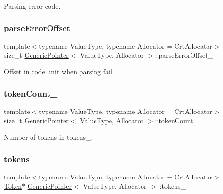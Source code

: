 Parsing error code. 

\mbox{\label{classGenericPointer_ad103ed62e206319f1f0f4aa271866e37}} 
\subsubsection{\texorpdfstring{parse\+Error\+Offset\+\_\+}{parseErrorOffset\_}}
{\footnotesize\ttfamily template$<$typename Value\+Type, typename Allocator = Crt\+Allocator$>$ \\
size\+\_\+t \hyperlink{classGenericPointer}{Generic\+Pointer}$<$ Value\+Type, Allocator $>$\+::parse\+Error\+Offset\+\_\+}



Offset in code unit when parsing fail. 

\mbox{\label{classGenericPointer_a7051cf59af6622542a050bd0ff0340f8}} 
\subsubsection{\texorpdfstring{token\+Count\+\_\+}{tokenCount\_}}
{\footnotesize\ttfamily template$<$typename Value\+Type, typename Allocator = Crt\+Allocator$>$ \\
size\+\_\+t \hyperlink{classGenericPointer}{Generic\+Pointer}$<$ Value\+Type, Allocator $>$\+::token\+Count\+\_\+}



Number of tokens in tokens\+\_\+. 

\mbox{\label{classGenericPointer_a997793c66ea1a264089c37c8731eb138}} 
\subsubsection{\texorpdfstring{tokens\+\_\+}{tokens\_}}
{\footnotesize\ttfamily template$<$typename Value\+Type, typename Allocator = Crt\+Allocator$>$ \\
\hyperlink{structGenericPointer_1_1Token}{Token}$\ast$ \hyperlink{classGenericPointer}{Generic\+Pointer}$<$ Value\+Type, Allocator $>$\+::tokens\+\_\+}



